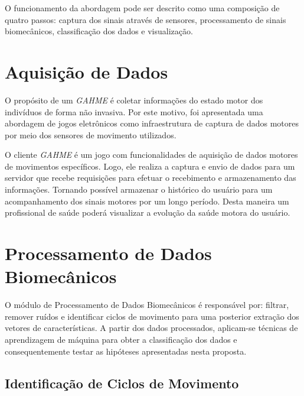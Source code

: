 
O funcionamento da abordagem pode ser descrito como uma composição de quatro passos: captura dos sinais através de sensores, processamento de sinais biomecânicos, classificação dos dados e visualização.

\section{Aquisição de Dados}
O propósito de um \textit{GAHME} é coletar informações do estado motor dos indivíduos de forma não invasiva. Por este motivo, foi apresentada uma abordagem de jogos eletrônicos como infraestrutura de captura de dados motores por meio dos sensores de movimento utilizados.

O cliente \textit{GAHME} é um jogo com funcionalidades de aquisição de dados motores de movimentos específicos. Logo, ele realiza a captura e envio de dados para um servidor que recebe requisições para efetuar o recebimento e armazenamento das informações. Tornando possível armazenar o histórico do usuário para um acompanhamento dos sinais motores por um longo período. Desta maneira um profissional de saúde poderá visualizar a evolução da saúde motora do usuário.

\section{Processamento de Dados Biomecânicos}\label{sec:processador_bio}
O módulo de Processamento de Dados Biomecânicos é responsável por: filtrar, remover ruídos e identificar ciclos de movimento para uma posterior extração dos vetores de características. A partir dos dados processados, aplicam-se técnicas de aprendizagem de máquina para obter a classificação dos dados e consequentemente testar as hipóteses apresentadas nesta proposta.

\subsection{Identificação de Ciclos de Movimento}\label{section:identificao_ciclos}

